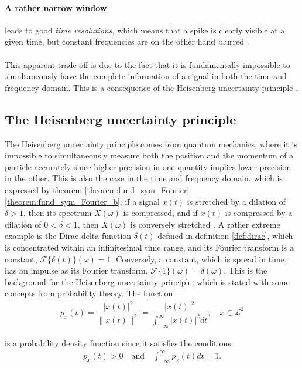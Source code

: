 \paragraph{A rather narrow window} leads to good \textit{time resolutions}, which means that a spike is clearly visible at a given time, but constant frequencies are on the other hand blurred \cite{Davis}.
\\ \\
This apparent trade-off is due to the fact that it is fundamentally impossible to simultaneously have the complete information of a signal in both the time and frequency domain. This is a consequence of the Heisenberg uncertainty principle \cite{page 409, Wang}.

\subsection{The Heisenberg uncertainty principle}\label{sec:heisenberg}
The Heisenberg uncertainty principle comes from quantum mechanics, where it is impossible to simultaneously measure both the position and the momentum of a particle accurately since higher precision in one quantity implies lower precision in the other. This is also the case in the time and frequency domain, which is expressed by theorem \ref{theorem:fund_sym_Fourier}  \ref{theorem:fund_sym_Fourier_b}; if a signal $x(t)$ is stretched by a dilation of $\delta > 1$, then its spectrum $X(\omega)$ is compressed, and if $x(t)$ is compressed by a dilation of $0 < \delta < 1$, then $X(\omega)$ is conversely stretched \cite{pages 123-124, 135, Wang}. A rather extreme example is the Dirac delta function $\delta(t)$ defined in definition \ref{def:dirac}, which is concentrated within an infinitesimal time range, and its Fourier transform is a constant, $\mathcal{F}\{\delta(t)\}(\omega) = 1$. Conversely, a constant, which is spread in time, has an impulse as its Fourier transform, $\mathcal{F}\{1\}(\omega) = \delta(\omega)$. This is the background for the Heisenberg uncertainty principle, which is stated with some concepts from probability theory. The function 
\begin{align*}
p_x(t) = \dfrac{|x(t)|^2}{\|x(t)\|^2} = \dfrac{|x(t)|^2}{\int_{-\infty}^\infty |x(t)|^2 dt}, \quad x \in \mathcal{L}^2
\end{align*}

is a probability density function since it satisfies the conditions
\begin{align*}
p_x(t) > 0 \quad \text{and} \quad \int_{-\infty}^\infty p_x(t) dt = 1.
\end{align*}

